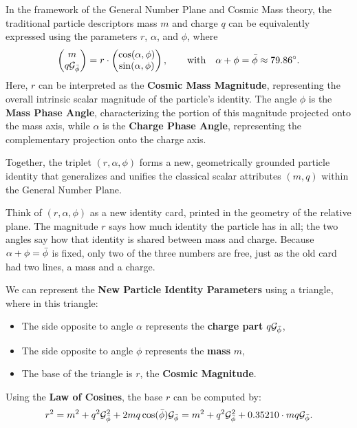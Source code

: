 \begin{remark}\label{rem:identity}
In the framework of the General Number Plane and Cosmic Mass theory, the traditional particle descriptors mass $m$ and charge $q$ can be equivalently expressed using the parameters $r$, $\alpha$, and $\phi$, where
\[
\begin{pmatrix} m \\ q\mathcal{G}_{\bar{\phi}} \end{pmatrix} = r \cdot \begin{pmatrix} \cos(\alpha, \phi) \\ \sin(\alpha, \phi) \end{pmatrix}, \qquad \text{with} \quad \alpha + \phi = \bar{\phi} \approx 79.86^\circ .
\]
Here, $r$ can be interpreted as the \textbf{Cosmic Mass Magnitude}, representing the overall intrinsic scalar magnitude of the particle's identity. The angle $\phi$ is the \textbf{Mass Phase Angle}, characterizing the portion of this magnitude projected onto the mass axis, while $\alpha$ is the \textbf{Charge Phase Angle}, representing the complementary projection onto the charge axis.

Together, the triplet $(r, \alpha, \phi)$ forms a new, geometrically grounded particle identity that generalizes and unifies the classical scalar attributes $(m, q)$ within the General Number Plane.
\end{remark}

\begin{plainwords}
Think of $(r, \alpha, \phi)$ as a new identity card, printed in the geometry of the relative plane. The magnitude $r$ says how much identity the particle has in all; the two angles say how that identity is shared between mass and charge. Because $\alpha + \phi = \bar{\phi}$ is fixed, only two of the three numbers are free, just as the old card had two lines, a mass and a charge.
\end{plainwords}

\begin{remark}\label{rem:identity-triangle}
We can represent the \textbf{New Particle Identity Parameters} using a triangle, where in this triangle:
\begin{itemize}
  \item The side opposite to angle $\alpha$ represents the \textbf{charge part} $q\mathcal{G}_{\bar{\phi}}$,
  \item The side opposite to angle $\phi$ represents the \textbf{mass} $m$,
  \item The base of the triangle is $r$, the \textbf{Cosmic Magnitude}.
\end{itemize}
Using the \textbf{Law of Cosines}, the base $r$ can be computed by:
\[
r^2 = m^2 + q^2\mathcal{G}_{\bar{\phi}}^2 + 2mq\cos(\bar{\phi})\mathcal{G}_{\bar{\phi}} = m^2 + q^2\mathcal{G}_{\bar{\phi}}^2 + 0.35210 \cdot mq\mathcal{G}_{\bar{\phi}} .
\]
\end{remark}

